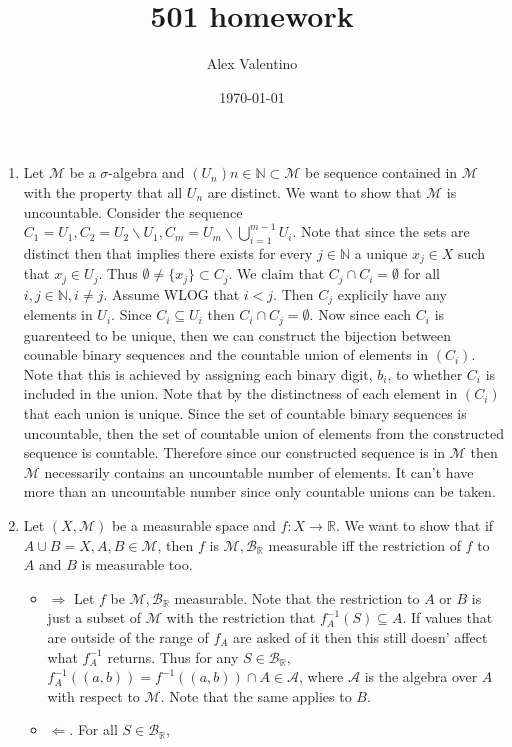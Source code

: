 \documentclass[12pt, letterpaper]{article}
\date{\today}
\author{Alex Valentino}
\title{501 homework}
\newcommand{\N}{\mathbb{N}}
\newcommand{\R}{\mathbb{R}}
\begin{document}
\begin{enumerate}
	\item[1] Let $\mathcal{M}$ be a $\sigma$-algebra and $(U_n){n \in \N} \subset \mathcal{M}$ be sequence contained in $\mathcal{M}$ with the property that all $U_n$ 
	are distinct.  We want to show that $\mathcal{M}$ is uncountable.  Consider the sequence 
	$C_1 = U_1, C_2 = U_2 \backslash U_1, C_m = U_m \backslash \bigcup_{i=1}^{m - 1} U_i$.  Note that since the sets are distinct then that implies there exists for 
	every $j \in \N$ a unique $x_j \in X$ such that $x_j \in U_j$.  Thus 
	$\emptyset \neq \{x_{j}\} \subset C_j$.  We claim that $C_j \cap C_i = \emptyset$
	for all $i,j \in \N, i \neq j$.  Assume WLOG that $i < j$.  Then $C_j$ explicily have any 
	elements in $U_i$.  Since $C_i \subseteq U_i$ then $C_i \cap C_j = \emptyset$.  
	Now since each $C_i$ is guarenteed to be unique, then we can construct the bijection
	between counable binary sequences and the countable union of elements in $(C_i)$.
	Note that this is achieved by assigning each binary digit, $b_i$, to whether 
	$C_i$ is included in the union.  Note that by the distinctness of each element in 
	$(C_i)$ that each union is unique.  Since the set of countable binary sequences is 
	uncountable, then the set of countable union of elements from the constructed sequence is countable.  Therefore since our constructed sequence is in $\mathcal{M}$
	then $\mathcal{M}$ necessarily contains an uncountable number of elements.  It can't
	have more than an uncountable number since only countable unions can be taken.  
	\item[4] Let $(X, \mathcal{M})$ be a measurable space and $f: X \to \R$.  We want 
	to show that if $A \cup B = X, A, B \in \mathcal{M}$, then $f$ is $\mathcal{M}, \mathcal{B}_\R$ measurable iff the restriction of $f$ to $A$ and $B$ is measurable too.
	\begin{itemize}
		\item $\Rightarrow$ Let $f$ be $\mathcal{M},\mathcal{B}_\R$ measurable.  
		Note that the restriction to $A$ or $B$ is just a subset of $\mathcal{M}$ with 
		the restriction that $f_A^{-1}(S) \subseteq A$.  If values that are outside 
		of the range of $f_A$ are asked of it then this still doesn' affect what $f_A^{-1}$ returns.  Thus for any $S \in \mathcal{B}_\R,$ $f_A^{-1}((a,b)) = f^{-1}((a,b)) \cap A \in \mathcal{A}$, where $\mathcal{A}$ is the algebra over $A$ with 
		respect to $\mathcal{M}$.  Note that the same applies to $B$. 
		\item $\Leftarrow$.  For all $S \in \mathcal{B}_\R$, 

\end{itemize}
\end{enumerate}
\end{document}
